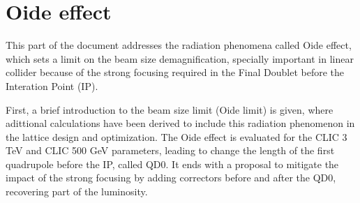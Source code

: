 \chapter{Oide effect}
This part of the document addresses the radiation phenomena called Oide effect\cite{Oide}, which sets a limit on the beam size demagnification, specially important in linear collider because of the strong focusing required in the Final Doublet before the Interation Point (IP).\par
First, a brief introduction to the beam size limit (Oide limit) is given, where adittional calculations have been derived to include this radiation phenomenon in the lattice design and optimization. The Oide effect is evaluated for the CLIC 3 TeV and CLIC 500 GeV parameters, leading to change the length of the first quadrupole before the IP, called QD0. It ends with a proposal to mitigate the impact of the strong focusing by adding correctors before and after the QD0, recovering part of the luminosity.\par
